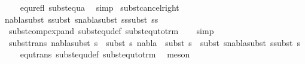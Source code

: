 \begin{isabellebody}
%
\isadelimproof
\ \ %
\endisadelimproof
%
\isatagproof
{}\isamarkupfalse%
\ equ{\isacharunderscore}{\kern0pt}refl\ subst{\isacharunderscore}{\kern0pt}equ{\isacharunderscore}{\kern0pt}a\ \isamarkupfalse%
\ simp%
\endisatagproof
{\isafoldproof}%
%
\isadelimproof
\isanewline
%
\endisadelimproof
\isanewline
\isanewline
{}\isamarkupfalse%
\ subst{\isacharunderscore}{\kern0pt}cancel{\isacharunderscore}{\kern0pt}right{\isacharcolon}{\kern0pt}\ \isanewline
{\isachardoublequoteopen}{\isasymlbrakk}nabla{\isasymTurnstile}{\isacharparenleft}{\kern0pt}subst\ s{}{\isacharparenright}{\kern0pt}{\isasymapprox}{\isacharparenleft}{\kern0pt}subst\ s{}{\isacharparenright}{\kern0pt}{\isasymrbrakk}{\isasymLongrightarrow}nabla{\isasymTurnstile}{\isacharparenleft}{\kern0pt}subst\ {\isacharparenleft}{\kern0pt}s{}{\isasymbullet}s{\isacharparenright}{\kern0pt}{\isacharparenright}{\kern0pt}{\isasymapprox}{\isacharparenleft}{\kern0pt}subst\ {\isacharparenleft}{\kern0pt}s{}{\isasymbullet}s{\isacharparenright}{\kern0pt}{\isacharparenright}{\kern0pt}{\isachardoublequoteclose}\ \isanewline
%
\isadelimproof
\ \ %
\endisadelimproof
%
\isatagproof
{}\isamarkupfalse%
\ subst{\isacharunderscore}{\kern0pt}comp{\isacharunderscore}{\kern0pt}expand\ subst{\isacharunderscore}{\kern0pt}equ{\isacharunderscore}{\kern0pt}def\ subst{\isacharunderscore}{\kern0pt}equ{\isacharunderscore}{\kern0pt}to{\isacharunderscore}{\kern0pt}trm\isanewline
\ \ \isamarkupfalse%
\ simp%
\endisatagproof
{\isafoldproof}%
%
\isadelimproof
\isanewline
%
\endisadelimproof
\isanewline
{}\isamarkupfalse%
\ subst{\isacharunderscore}{\kern0pt}trans{\isacharcolon}{\kern0pt}\ {\isachardoublequoteopen}{\isasymlbrakk}nabla{\isasymTurnstile}subst\ s{}\ {\isasymapprox}\ subst\ s{}{\isacharsemicolon}{\kern0pt}\ nabla\ {\isasymTurnstile}\ subst\ s{}\ {\isasymapprox}\ subst\ s{}{\isasymrbrakk}{\isasymLongrightarrow}nabla{\isasymTurnstile}subst\ s{}{\isasymapprox}subst\ s{}{\isachardoublequoteclose}\isanewline
%
\isadelimproof
\ \ %
\endisadelimproof
%
\isatagproof
{}\isamarkupfalse%
\ equ{\isacharunderscore}{\kern0pt}trans\ subst{\isacharunderscore}{\kern0pt}equ{\isacharunderscore}{\kern0pt}def\ subst{\isacharunderscore}{\kern0pt}equ{\isacharunderscore}{\kern0pt}to{\isacharunderscore}{\kern0pt}trm\ \isamarkupfalse%
\ meson%
\endisatagproof
{\isafoldproof}%
%
\isadelimproof
\isanewline
%
\endisadelimproof

\end{isabellebody}

